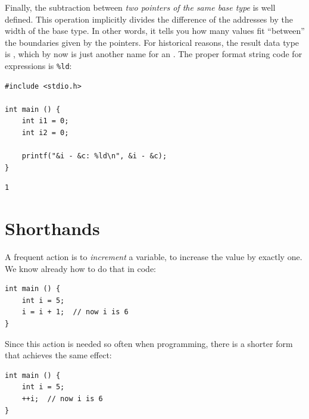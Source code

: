 {{{{Finally, the subtraction between \emph{two pointers of the same base type} is well defined. This operation implicitly divides the difference of the addresses by the width of the base type. In other words, it tells you how many values fit \enquote{between} the boundaries given by the pointers. For historical reasons, the result data type is , which by now is just another name for an . The proper format string code for  expressions is \texttt{\%ld}:

\begin{tcbraster}[raster columns=2,
                  raster equal height,
                  nobeforeafter,
                  raster column skip=0.2cm]
\begin{codebox}[pointerDifference.c]
\begin{verbatim}
#include <stdio.h>

int main () {
    int i1 = 0;
    int i2 = 0;

    printf("&i - &c: %ld\n", &i - &c);
}
\end{verbatim}
\end{codebox}
%
\begin{cmdbox}
\begin{verbatim}
1
\end{verbatim}
\end{cmdbox}
\end{tcbraster}


\section{Shorthands} \label{sec:Shorthands}
A frequent action is to \emph{increment} a variable, \ie to increase the value by exactly one. We know already how to do that in code:
\begin{codebox}[explicitIncrement.c]
\begin{verbatim}
int main () {
    int i = 5;
    i = i + 1;  // now i is 6
}
\end{verbatim}
\end{codebox}

Since this action is needed so often when programming, there is a shorter form that achieves the same effect:
\begin{codebox}[explicitIncrement.c]
\begin{verbatim}
int main () {
    int i = 5;
    ++i;  // now i is 6
}
\end{verbatim}
\end{codebox}

}}}}
